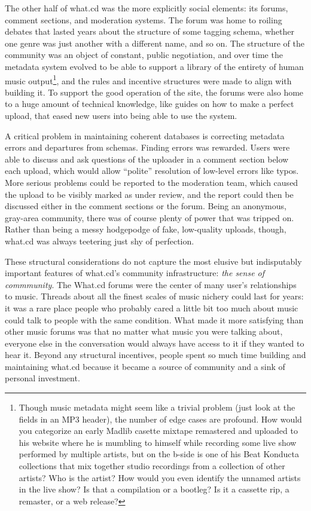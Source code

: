 \documentclass[10pt]{tufte-book}
\begin{document}
The other half of what.cd was the more explicitly social elements: its
forums, comment sections, and moderation systems. The forum was home to
roiling debates that lasted years about the structure of some tagging
schema, whether one genre was just another with a different name, and so
on. The structure of the community was an object of constant, public
negotiation, and over time the metadata system evolved to be able to
support a library of the entirety of human music output\footnote{Though
  music metadata might seem like a trivial problem (just look at the
  fields in an MP3 header), the number of edge cases are profound. How
  would you categorize an early Madlib casette mixtape remastered and
  uploaded to his website where he is mumbling to himself while
  recording some live show performed by multiple artists, but on the
  b-side is one of his Beat Konducta collections that mix together
  studio recordings from a collection of other artists? Who is the
  artist? How would you even identify the unnamed artists in the live
  show? Is that a compilation or a bootleg? Is it a cassette rip, a
  remaster, or a web release?}, and the rules and incentive structures
were made to align with building it. To support the good operation of
the site, the forums were also home to a huge amount of technical
knowledge, like guides on how to make a perfect upload, that eased new
users into being able to use the system.

A critical problem in maintaining coherent databases is correcting
metadata errors and departures from schemas. Finding errors was
rewarded. Users were able to discuss and ask questions of the uploader
in a comment section below each upload, which would allow ``polite''
resolution of low-level errors like typos. More serious problems could
be reported to the moderation team, which caused the upload to be
visibly marked as under review, and the report could then be discussed
either in the comment sections or the forum. Being an anonymous,
gray-area community, there was of course plenty of power that was
tripped on. Rather than being a messy hodgepodge of fake, low-quality
uploads, though, what.cd was always teetering just shy of perfection.

These structural considerations do not capture the most elusive but
indisputably important features of what.cd's community infrastructure:
\emph{the sense of commmunity}. The What.cd forums were the center of
many user's relationships to music. Threads about all the finest scales
of music nichery could last for years: it was a rare place people who
probably cared a little bit too much about music could talk to people
with the same condition. What made it more satisfying than other music
forums was that no matter what music you were talking about, everyone
else in the conversation would always have access to it if they wanted
to hear it. Beyond any structural incentives, people spent so much time
building and maintaining what.cd because it became a source of community
and a sink of personal investment.
\end{document}
